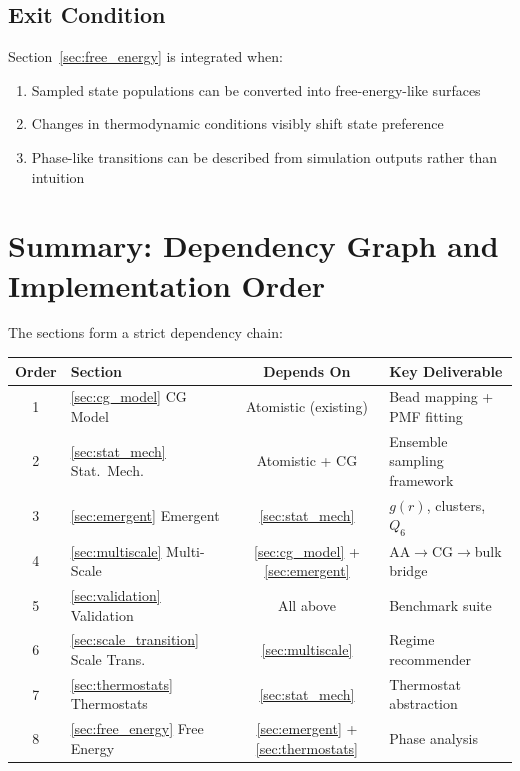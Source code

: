 \documentclass[11pt]{article}
\begin{document}
\subsection{Exit Condition}

Section~\ref{sec:free_energy} is integrated when:
\begin{enumerate}
  \item Sampled state populations can be converted into free-energy-like
        surfaces
  \item Changes in thermodynamic conditions visibly shift state preference
  \item Phase-like transitions can be described from simulation outputs
        rather than intuition
\end{enumerate}

\section{Summary: Dependency Graph and Implementation Order}

The sections form a strict dependency chain:

\begin{center}
\begin{tabular}{clcl}
\toprule
\textbf{Order} & \textbf{Section} & \textbf{Depends On} & \textbf{Key Deliverable} \\
\midrule
1 & \ref{sec:cg_model} CG Model & Atomistic (existing) & Bead mapping + PMF fitting \\
2 & \ref{sec:stat_mech} Stat.\ Mech. & Atomistic + CG & Ensemble sampling framework \\
3 & \ref{sec:emergent} Emergent & \ref{sec:stat_mech} & $g(r)$, clusters, $Q_6$ \\
4 & \ref{sec:multiscale} Multi-Scale & \ref{sec:cg_model} + \ref{sec:emergent} & AA$\to$CG$\to$bulk bridge \\
5 & \ref{sec:validation} Validation & All above & Benchmark suite \\
6 & \ref{sec:scale_transition} Scale Trans. & \ref{sec:multiscale} & Regime recommender \\
7 & \ref{sec:thermostats} Thermostats & \ref{sec:stat_mech} & Thermostat abstraction \\
8 & \ref{sec:free_energy} Free Energy & \ref{sec:emergent} + \ref{sec:thermostats} & Phase analysis \\
\bottomrule
\end{tabular}
\end{center}
\end{document}
